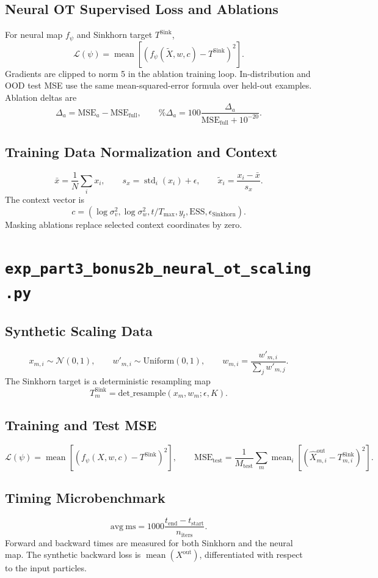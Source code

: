 \documentclass[11pt]{article}
\newcommand{\code}[1]{\texttt{#1}}
\newcommand{\ESS}{\mathrm{ESS}}
\begin{document}
\subsection*{Neural OT Supervised Loss and Ablations}
For neural map \(f_\psi\) and Sinkhorn target \(T^{\mathrm{Sink}}\),
\[
\mathcal L(\psi)=\operatorname{mean}\left[(f_\psi(\tilde X,w,c)-T^{\mathrm{Sink}})^2\right].
\]
Gradients are clipped to norm 5 in the ablation training loop. In-distribution and OOD test MSE use the same mean-squared-error formula over held-out examples. Ablation deltas are
\[
\Delta_a=\mathrm{MSE}_a-\mathrm{MSE}_{\mathrm{full}},\qquad
\%\Delta_a=100\frac{\Delta_a}{\mathrm{MSE}_{\mathrm{full}}+10^{-20}}.
\]

\subsection*{Training Data Normalization and Context}
\[
\bar x=\frac{1}{N}\sum_ix_i,\qquad
s_x=\operatorname{std}_i(x_i)+\epsilon,\qquad
\tilde x_i=\frac{x_i-\bar x}{s_x}.
\]
The context vector is
\[
c=(\log\sigma_v^2,\log\sigma_w^2,t/T_{\max},y_t,\ESS,\epsilon_{\mathrm{Sinkhorn}}).
\]
Masking ablations replace selected context coordinates by zero.

\section{\code{exp\_part3\_bonus2b\_neural\_ot\_scaling.py}}
\subsection*{Synthetic Scaling Data}
\[
x_{m,i}\sim\mathcal N(0,1),\qquad
w'_{m,i}\sim\mathrm{Uniform}(0,1),\qquad
w_{m,i}=\frac{w'_{m,i}}{\sum_jw'_{m,j}}.
\]
The Sinkhorn target is a deterministic resampling map
\[
T_m^{\mathrm{Sink}}=\mathrm{det\_resample}(x_m,w_m;\epsilon,K).
\]

\subsection*{Training and Test MSE}
\[
\mathcal L(\psi)=\operatorname{mean}\left[(f_\psi(X,w,c)-T^{\mathrm{Sink}})^2\right],
\qquad
\mathrm{MSE}_{\mathrm{test}}=\frac{1}{M_{\mathrm{test}}}\sum_m\operatorname{mean}_i
\left[(\hat X^{\mathrm{out}}_{m,i}-T^{\mathrm{Sink}}_{m,i})^2\right].
\]

\subsection*{Timing Microbenchmark}
\[
\mathrm{avg\ ms}=1000\frac{t_{\mathrm{end}}-t_{\mathrm{start}}}{n_{\mathrm{iters}}}.
\]
Forward and backward times are measured for both Sinkhorn and the neural map. The synthetic backward loss is \(\operatorname{mean}(X^{\mathrm{out}})\), differentiated with respect to the input particles.
\end{document}
